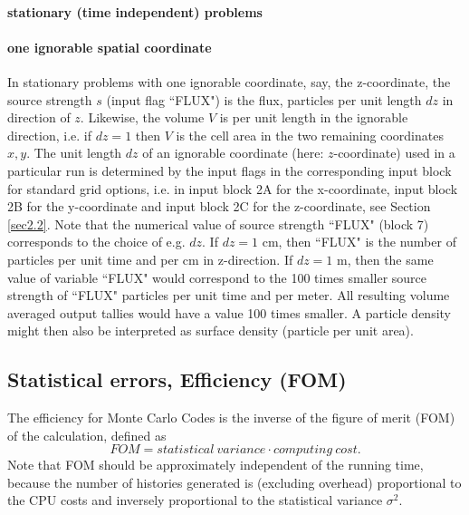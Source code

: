 \paragraph{stationary (time independent) problems}
\paragraph{one ignorable spatial coordinate}
In stationary problems with one ignorable coordinate, say, the z-coordinate,
the source strength $s$ (input flag ``FLUX") is the flux, particles per
unit length $dz$ in direction of $z$. Likewise, the volume $V$ is per unit length in the ignorable direction,
i.e. if $dz=1$ then $V$
is the cell area in the two remaining coordinates $x,y$.
The unit length $dz$ of an ignorable coordinate (here: $z$-coordinate) used in a particular run
is determined by the input flags in the corresponding input block for standard grid options,
i.e. in input block 2A for the x-coordinate, input block 2B for the y-coordinate and input block
2C for the z-coordinate, see Section \ref{sec2.2}. Note that the numerical value of source strength
``FLUX" (block 7) corresponds to the choice of e.g. $dz$. If $dz=1$ cm, then ``FLUX" is the number of particles
per unit time and per cm in z-direction. If $dz=1$ m, then the same value of variable ``FLUX"
would correspond to the 100 times smaller source strength of ``FLUX" particles per unit time and per meter.
All resulting volume averaged output tallies would have a value 100 times smaller. A particle density
might then also be interpreted as surface density (particle per unit area).



\subsection{Statistical errors, Efficiency (FOM)} \label{sec1.2.1}
The efficiency for Monte Carlo Codes is the
inverse of the figure of merit (FOM) of the calculation, defined
as
\begin{equation} \label{eq1.13}
FOM = statistical \ variance    \cdot   computing \ cost.
\end{equation}
Note that FOM should be approximately independent of the running
time, because the number of histories generated is (excluding
overhead) proportional to the CPU costs and inversely proportional
to the statistical variance $\sigma^2$.

